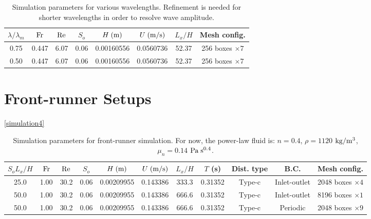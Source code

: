 \documentclass[a4paper]{article}
\newcommand{\fr}{{\rm{Fr}}}
\begin{document}
\begin{table}[htbp]
	\centering
	\begin{tabular}{cccccccc}
		$\lambda/\lambda_m$ & $\fr$ & $\rm Re$ & $S_o$ & $H\;{\rm (m)}$ & $U\;{\rm (m/s)}$ & $L_x/H$ & Mesh config.\\
		\toprule
		0.75 & 0.447 & 6.07 & 0.06 & 0.00160556 & 0.0560736 & 52.37  & 256 boxes $\times 7$\\
		
		0.50 & 0.447 & 6.07 & 0.06 & 0.00160556 & 0.0560736 & 52.37  & 256 boxes $\times 7$\\

		\bottomrule 
	\end{tabular}
	\caption{Simulation parameters for various wavelengths. Refinement is needed for shorter wavelengths in order to resolve wave amplitude.}
	\label{simulation5}
\end{table}

\section{Front-runner Setups}
\autoref{simulation4}

\begin{table}[htbp]
	\centering
	\begin{tabular}{ccccccccccc}
		$S_oL_x/H$ & $\fr$ & $\rm Re$ & $S_o$ & $H\;{\rm (m)}$ & $U\;{\rm (m/s)}$ & $L_x/H$ & $T$ (s) & Dist. type & B.C.  & Mesh config.\\
		\toprule
		25.0 & 1.00 & 30.2 & 0.06 & 0.00209955 & 0.143386 & 333.3 & 0.31352 & Type-c & Inlet-outlet & 2048 boxes $\times 4$\\
		50.0 & 1.00 & 30.2 & 0.06 & 0.00209955 & 0.143386 & 666.6 & 0.31352 & Type-c & Inlet-outlet & 8196 boxes $\times 1$\\
		50.0 & 1.00 & 30.2 & 0.06 & 0.00209955 & 0.143386 & 666.6 & 0.31352 & Type-c & Periodic & 2048 boxes $\times 9$\\
		\bottomrule 
	\end{tabular}
	\caption{Simulation parameters for front-runner simulation. For now, the power-law fluid is: $n=0.4$, $\rho=1120$ $\rm{kg/m^3}$, $\mu_n=0.14$ $\rm Pa\;s^{0.4}$.}
	\label{simulation4}
\end{table}
\end{document}

